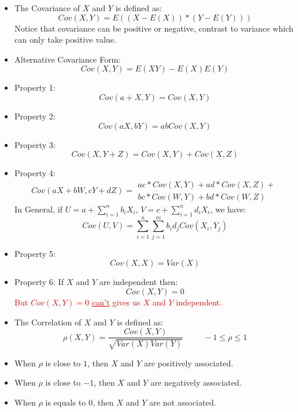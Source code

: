 \documentclass[12pt]{article}
\begin{document}
\begin{multicols*}{4}
\begin{tcolorbox}[title=Covariance]
\begin{itemize}[leftmargin=*]
            \item The Covariance of $X$ and $Y$ is defined as:
                  $$Cov(X, Y)=E((X-E(X))*(Y-E(Y)))$$
                  Notice that covariance can be positive or negative, contrast to variance which can only take positive value.
            \item Alternative Covariance Form:
                  $$Cov(X, Y)=E(XY)-E(X)E(Y)$$
            \item Property 1:
                  $$Cov(a+X, Y)=Cov(X, Y)$$
            \item Property 2:
                  $$Cov(aX, bY)=abCov(X, Y)$$
            \item Property 3:
                  $$Cov(X, Y+Z)=Cov(X, Y)+Cov(X, Z)$$
            \item Property 4:
                  $$Cov(aX+bW, cY+dZ)=\begin{array}{l}
                          ac*Cov(X, Y)+ad*Cov(X, Z)+ \\
                          bc*Cov(W, Y)+bd*Cov(W, Z)\end{array}$$
                  In General, if $U=a+\sum_{i=1}^nb_iX_i$, $V=c+\sum_{i=1}^nd_iX_i$, we have:
                  $$Cov(U, V)=\sum_{i=1}^n\sum_{j=1}^mb_id_jCov(X_i, Y_j)$$
            \item Property 5:
                  $$Cov(X, X)=Var(X)$$
            \item Property 6: If $X$ and $Y$ are independent then:
                  $$Cov(X, Y)=0$$
                  \textcolor{red}{But $Cov(X, Y)=0$ \underline{can't} gives us $X$ and $Y$ independent.}
        \end{itemize}
    \end{tcolorbox}
    \begin{tcolorbox}[title=Correlation]
        \begin{itemize}[leftmargin=*]
            \item The Correlation of $X$ and $Y$ is defined as:
                  $$\rho(X, Y)=\frac{Cov(X, Y)}{\sqrt{Var(X)Var(Y)}}\hspace{1cm}-1\leq\rho\leq 1$$
            \item When $\rho$ is close to $1$, then $X$ and $Y$ are positively associated.
            \item When $\rho$ is close to $-1$, then $X$ and $Y$ are negatively associated.
            \item When $\rho$ is equals to $0$, then $X$ and $Y$ are not associated.
        \end{itemize}
    \end{tcolorbox}

\end{multicols*}
\end{document}
